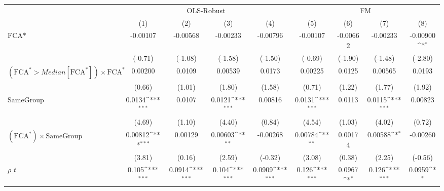 {
\def\sym#1{\ifmmode^{#1}\else\(^{#1}\)\fi}
\begin{tabular}{l*{8}{c}}
\hline\hline
                &\multicolumn{4}{c}{OLS-Robust}                                             &\multicolumn{4}{c}{FM}                                                     \\\cmidrule(lr){2-5}\cmidrule(lr){6-9}
                &\multicolumn{1}{c}{(1)}         &\multicolumn{1}{c}{(2)}         &\multicolumn{1}{c}{(3)}         &\multicolumn{1}{c}{(4)}         &\multicolumn{1}{c}{(5)}         &\multicolumn{1}{c}{(6)}         &\multicolumn{1}{c}{(7)}         &\multicolumn{1}{c}{(8)}         \\
\hline
$ \text{FCA*} $ & -0.00107         & -0.00568         & -0.00233         & -0.00796         & -0.00107         & -0.00662         & -0.00233         & -0.00900\sym{*}  \\
                &  (-0.71)         &  (-1.08)         &  (-1.58)         &  (-1.50)         &  (-0.69)         &  (-1.90)         &  (-1.48)         &  (-2.80)         \\
[1em]
 $ (\text{FCA}^* > Median[\text{FCA}^*]) \times {\text{FCA} ^*}  $ &  0.00200         &   0.0109         &  0.00539         &   0.0173         &  0.00225         &   0.0125         &  0.00565         &   0.0193         \\
                &   (0.66)         &   (1.01)         &   (1.80)         &   (1.58)         &   (0.71)         &   (1.22)         &   (1.77)         &   (1.92)         \\
[1em]
SameGroup       &   0.0134\sym{***}&   0.0107         &   0.0121\sym{***}&  0.00816         &   0.0131\sym{***}&   0.0113         &   0.0115\sym{***}&  0.00823         \\
                &   (4.69)         &   (1.10)         &   (4.40)         &   (0.84)         &   (4.54)         &   (1.03)         &   (4.02)         &   (0.72)         \\
[1em]
 $ (\text{FCA}^*) \times {\text{SameGroup} }  $ &  0.00812\sym{***}&  0.00129         &  0.00603\sym{**} & -0.00268         &  0.00784\sym{**} &  0.00174         &  0.00588\sym{*}  & -0.00260         \\
                &   (3.81)         &   (0.16)         &   (2.59)         &  (-0.32)         &   (3.08)         &   (0.38)         &   (2.25)         &  (-0.56)         \\
[1em]
 $ {\rho\_t} $   &    0.105\sym{***}&   0.0914\sym{***}&    0.104\sym{***}&   0.0909\sym{***}&    0.126\sym{***}&   0.0967\sym{*}  &    0.126\sym{***}&   0.0959\sym{*}  \\

\end{tabular}}
